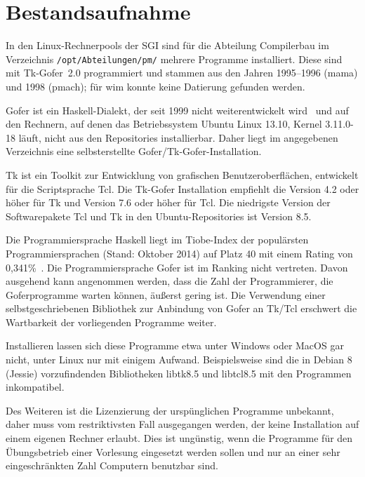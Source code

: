\documentclass[german, a4paper, parskip, bibliography=totoc]{scrartcl}
\begin{document}
\section{Bestandsaufnahme}
In den Linux-Rechnerpools der SGI sind für die Abteilung Compilerbau im
Verzeichnis \texttt{/opt/Abteilungen/pm/} mehrere Programme installiert.
Diese sind mit Tk-Gofer~2.0 programmiert und stammen aus den Jahren 1995--1996
(mama) und 1998 (pmach); für wim konnte keine Datierung gefunden werden.

Gofer ist ein Haskell-Dialekt, der seit 1999 nicht weiterentwickelt
wird~\cite{url_gofer} und auf den Rechnern, auf denen
das Betriebssystem Ubuntu Linux 13.10, Kernel 3.11.0-18 läuft, nicht aus den
Repositories installierbar. Daher liegt im angegebenen Verzeichnis eine
selbsterstellte Gofer/Tk-Gofer-Installation.

Tk ist ein Toolkit zur Entwicklung von grafischen Benutzeroberflächen,
entwickelt für die Scriptsprache Tcl. Die Tk-Gofer Installation empfiehlt die
Version 4.2 oder höher für Tk und Version 7.6 oder höher für Tcl. Die
niedrigste Version der Softwarepakete Tcl und Tk in den Ubuntu-Repositories
ist Version 8.5.

Die Programmiersprache Haskell liegt im Tiobe-Index der populärsten
Programmiersprachen (Stand: Oktober 2014) auf Platz 40 mit einem Rating von
0,341\%~\cite{url_tiobe}. Die Programmiersprache Gofer ist im Ranking nicht
vertreten. Davon ausgehend kann angenommen werden, dass die Zahl der
Programmierer, die Goferprogramme warten können, äußerst gering ist. Die
Verwendung einer selbstgeschriebenen Bibliothek zur Anbindung von Gofer an
Tk/Tcl erschwert die Wartbarkeit der vorliegenden Programme weiter.

Installieren lassen sich diese Programme etwa unter Windows oder MacOS
gar nicht, unter Linux nur mit einigem Aufwand. Beispielsweise sind die in
Debian 8 (Jessie) vorzufindenden Bibliotheken libtk8.5 und libtcl8.5 mit den
Programmen inkompatibel.

Des Weiteren ist die Lizenzierung der urspünglichen Programme unbekannt, daher
muss vom restriktivsten Fall ausgegangen werden, der keine Installation auf
einem eigenen Rechner erlaubt. Dies ist ungünstig, wenn die Programme für den
Übungsbetrieb einer Vorlesung eingesetzt werden sollen und nur an einer sehr
eingeschränkten Zahl Computern benutzbar sind.
\end{document}
